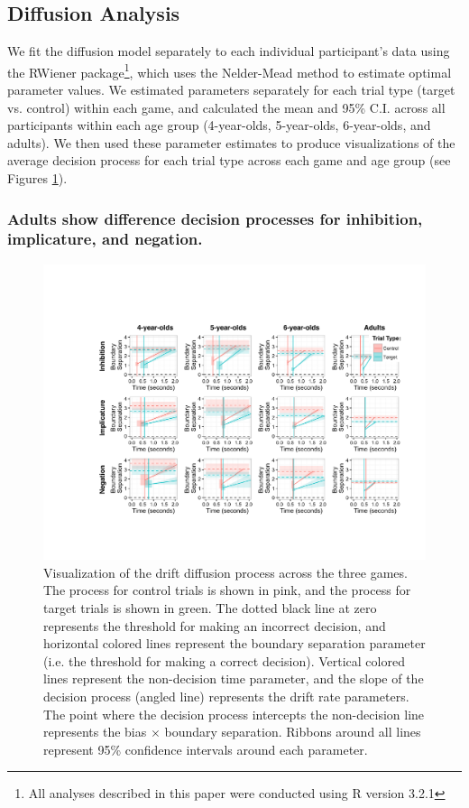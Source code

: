 \documentclass[10pt,letterpaper]{article}
\begin{document}
\subsection{Diffusion Analysis}

We fit the diffusion model separately to each individual participant's data using the RWiener package\footnote{All analyses described in this paper were conducted using R version 3.2.1}, which uses the Nelder-Mead method to estimate optimal parameter values.  We estimated parameters separately for each trial type (target vs. control) within each game, and calculated the mean and 95\% C.I. across all participants within each age group (4-year-olds, 5-year-olds, 6-year-olds, and adults).  We then used these parameter estimates to produce visualizations of the average decision process for each trial type across each game and age group (see Figures \ref{fig:ddm}).  

\subsubsection{Adults show difference decision processes for inhibition, implicature, and negation.}

\begin{figure}[t!]
\begin{center} 
\includegraphics[width=7in]{figures/ddm_vis.pdf}
\caption{\label{fig:ddm} Visualization of the drift diffusion process across the three games.  The process for control trials is shown in pink, and the process for target trials is shown in green.  The dotted black line at zero represents the threshold for making an incorrect decision, and horizontal colored lines represent the boundary separation parameter (i.e. the threshold for making a correct decision).  Vertical colored lines represent the non-decision time parameter, and the slope of the decision process (angled line) represents the drift rate parameters.  The point where the decision process intercepts the non-decision line represents the bias $\times$ boundary separation.  Ribbons around all lines represent 95\% confidence intervals around each parameter.}
\end{center} 
\end{figure}
\end{document}
